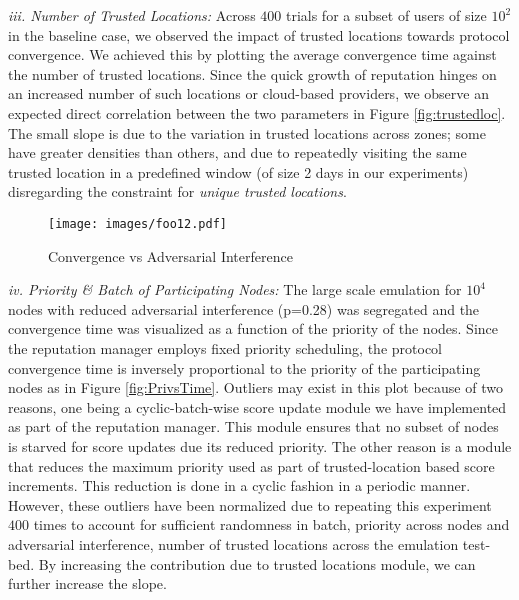\documentclass[letterpaper,twocolumn]{sig-alternate}
\begin{document}
\vspace{1mm}
{\em iii. Number of Trusted Locations:} Across $400$ trials for a subset of users of size $10^2$ in the baseline case, we observed the impact of trusted locations towards protocol convergence. We achieved this by plotting the average convergence time against the number of trusted locations. Since the quick growth of reputation hinges on an increased number of such locations or cloud-based providers, we observe an expected direct correlation between the two parameters in Figure \ref{fig:trustedloc}. The small slope is due to the variation in trusted locations across zones; some have greater densities than others, and due to repeatedly visiting the same trusted location in a predefined window (of size 2 days in our experiments) disregarding the constraint for {\em unique trusted locations}.

\begin{figure}[h]
  \begin{center}
      \texttt{[image: images/foo12.pdf]}
    \end{center}
\vspace{-0.1in}
  \caption{\small{Convergence vs Adversarial Interference}}
  \label{fig:convadv}
 \vspace{-0.1in}
\end{figure}

\vspace{1mm}
{\em iv. Priority \& Batch of Participating Nodes:} The large scale emulation for $10^4$ nodes with reduced adversarial interference (p=0.28) was segregated and the convergence time was visualized as a function of the priority of the nodes. Since the reputation manager employs fixed priority scheduling, the protocol convergence time is inversely proportional to the priority of the participating nodes as in Figure \ref{fig:PrivsTime}. Outliers may exist in this plot because of two reasons, one being a cyclic-batch-wise score update module we have implemented as part of the reputation manager. This module ensures that no subset of nodes is starved for score updates due its reduced priority. The other reason is a module that reduces the maximum priority used as part of trusted-location based score increments. This reduction is done in a cyclic fashion in a periodic manner. However, these outliers have been normalized due to repeating this experiment $400$ times to account for sufficient randomness in batch, priority across nodes and adversarial interference, number of trusted locations across the emulation test-bed. By increasing the contribution due to trusted locations module, we can further increase the slope.  
\end{document}
